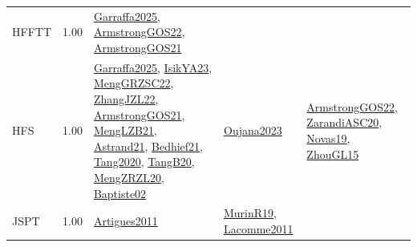 {\begin{longtable}{p{3cm}r>{\raggedright\arraybackslash}p{6cm}>{\raggedright\arraybackslash}p{6cm}>{\raggedright\arraybackslash}p{8cm}}
\index{HFFTT}\index{Classification!HFFTT}HFFTT &  1.00 & \hyperref[detail:Garraffa2025]{Garraffa2025}, \hyperref[detail:ArmstrongGOS22]{ArmstrongGOS22}, \hyperref[detail:ArmstrongGOS21]{ArmstrongGOS21} &  & \\
\index{HFS}\index{Classification!HFS}HFS &  1.00 & \hyperref[detail:Garraffa2025]{Garraffa2025}, \hyperref[detail:IsikYA23]{IsikYA23}, \hyperref[detail:MengGRZSC22]{MengGRZSC22}, \hyperref[detail:ZhangJZL22]{ZhangJZL22}, \hyperref[detail:ArmstrongGOS21]{ArmstrongGOS21}, \hyperref[detail:MengLZB21]{MengLZB21}, \hyperref[detail:Astrand21]{Astrand21}, \hyperref[detail:Bedhief21]{Bedhief21}, \hyperref[detail:Tang2020]{Tang2020}, \hyperref[detail:TangB20]{TangB20}, \hyperref[detail:MengZRZL20]{MengZRZL20}, \hyperref[detail:Baptiste02]{Baptiste02} & \hyperref[detail:Oujana2023]{Oujana2023} & \hyperref[detail:ArmstrongGOS22]{ArmstrongGOS22}, \hyperref[detail:ZarandiASC20]{ZarandiASC20}, \hyperref[detail:Novas19]{Novas19}, \hyperref[detail:ZhouGL15]{ZhouGL15}\\
\index{JSPT}\index{Classification!JSPT}JSPT &  1.00 & \hyperref[detail:Artigues2011]{Artigues2011} & \hyperref[detail:MurinR19]{MurinR19}, \hyperref[detail:Lacomme2011]{Lacomme2011} & \\

\end{longtable}}
